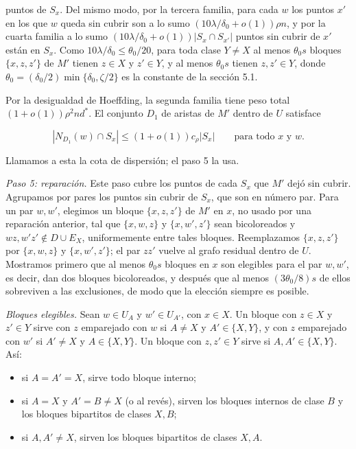 \documentclass[spanish,11pt,a4paper]{article}
\providecommand{\tightlist}{\setlength{\itemsep}{0pt}\setlength{\parskip}{0pt}}
\begin{document}
puntos de \(S_x\). Del mismo modo, por la tercera familia, para cada \(w\) los puntos \(x'\) en los que \(w\) queda sin cubrir son a lo sumo \((10\lambda/\delta_0+o(1))\rho n\), y por la cuarta familia a lo sumo \((10\lambda/\delta_0+o(1))|S_x\cap S_{x'}|\) puntos sin cubrir de \(x'\) están en \(S_x\). Como \(10\lambda/\delta_0\le\theta_0/20\), para toda clase \(Y\ne X\) al menos \(\theta_0s\) bloques \(\{x,z,z'\}\) de \(M'\) tienen \(z\in X\) y \(z'\in Y\), y al menos \(\theta_0s\) tienen \(z,z'\in Y\), donde \(\theta_0=(\delta_0/2)\min\{\delta_0,\zeta/2\}\) es la constante de la sección 5.1.

Por la desigualdad de Hoeffding, la segunda familia tiene peso total \((1+o(1))\rho^2nd^*\). El conjunto \(D_1\) de aristas de \(M'\) dentro de \(U\) satisface

\nopagebreak[4]
\[|N_{D_1}(w)\cap S_x|\le(1+o(1))c_\rho|S_x|\qquad\text{para todo }x\text{ y }w.\]

Llamamos a esta la cota de dispersión; el paso 5 la usa.

\emph{Paso 5: reparación.} Este paso cubre los puntos de cada \(S_x\) que \(M'\) dejó sin cubrir. Agrupamos por pares los puntos sin cubrir de \(S_x\), que son en número par. Para un par \(w,w'\), elegimos un bloque \(\{x,z,z'\}\) de \(M'\) en \(x\), no usado por una reparación anterior, tal que \(\{x,w,z\}\) y \(\{x,w',z'\}\) sean bicoloreados y \(wz,w'z'\notin D\cup E_X\), uniformemente entre tales bloques. Reemplazamos \(\{x,z,z'\}\) por \(\{x,w,z\}\) y \(\{x,w',z'\}\); el par \(zz'\) vuelve al grafo residual dentro de \(U\). Mostramos primero que al menos \(\theta_0s\) bloques en \(x\) son elegibles para el par \(w,w'\), es decir, dan dos bloques bicoloreados, y después que al menos \((3\theta_0/8)s\) de ellos sobreviven a las exclusiones, de modo que la elección siempre es posible.

\emph{Bloques elegibles.} Sean \(w\in U_A\) y \(w'\in U_{A'}\), con \(x\in X\). Un bloque con \(z\in X\) y \(z'\in Y\) sirve con \(z\) emparejado con \(w\) si \(A\ne X\) y \(A'\in\{X,Y\}\), y con \(z\) emparejado con \(w'\) si \(A'\ne X\) y \(A\in\{X,Y\}\). Un bloque con \(z,z'\in Y\) sirve si \(A,A'\in\{X,Y\}\). Así:

\begin{itemize}
\tightlist
\item
  si \(A=A'=X\), sirve todo bloque interno;
\item
  si \(A=X\) y \(A'=B\ne X\) (o al revés), sirven los bloques internos de clase \(B\) y los bloques bipartitos de clases \(X,B\);
\item
  si \(A,A'\ne X\), sirven los bloques bipartitos de clases \(X,A\).
\end{itemize}
\end{document}
